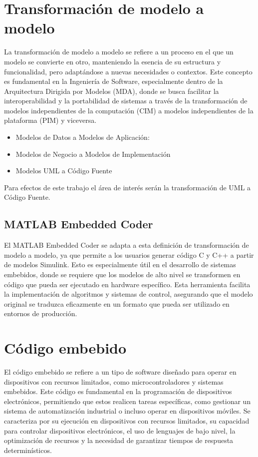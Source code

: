 \section{Transformación de modelo a modelo}

La transformación de modelo a modelo se refiere a un proceso en el que un modelo se convierte en otro, manteniendo la esencia de su estructura y funcionalidad, 
pero adaptándose a nuevas necesidades o contextos. Este concepto es fundamental en la Ingeniería de Software, especialmente dentro de la Arquitectura Dirigida 
por Modelos (MDA), donde se busca facilitar la interoperabilidad y la portabilidad de sistemas a través de la transformación de modelos independientes de la computación 
(CIM) a modelos independientes de la plataforma (PIM) y viceversa.

\begin{itemize}
    \item Modelos de Datos a Modelos de Aplicación:
    \item Modelos de Negocio a Modelos de Implementación
    \item Modelos UML a Código Fuente
\end{itemize}

Para efectos de este trabajo el área de interés serán la transformación de UML a Código Fuente.

\subsection{MATLAB Embedded Coder}

El MATLAB Embedded Coder se adapta a esta definición de transformación de modelo a modelo, ya que permite a los usuarios generar código C y C++ a partir de modelos 
Simulink. Esto es especialmente útil en el desarrollo de sistemas embebidos, donde se requiere que los modelos de alto nivel se transformen en código 
que pueda ser ejecutado en hardware específico. Esta herramienta facilita la implementación de algoritmos y sistemas de control, asegurando que el modelo original 
se traduzca eficazmente en un formato que pueda ser utilizado en entornos de producción.

\section{Código embebido}

El código embebido se refiere a un tipo de software diseñado para operar en dispositivos con recursos limitados, como microcontroladores y sistemas embebidos. 
Este código es fundamental en la programación de dispositivos electrónicos, permitiendo que estos realicen tareas específicas, como gestionar un sistema de 
automatización industrial o incluso operar en dispositivos móviles. Se caracteriza por su ejecución en dispositivos con recursos limitados, su capacidad 
para controlar dispositivos electrónicos, el uso de lenguajes de bajo nivel, la optimización de recursos y la necesidad de garantizar tiempos de respuesta 
determinísticos.


